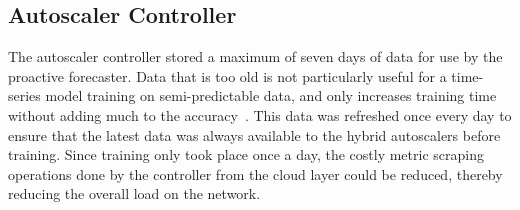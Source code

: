 \begin{center}
\begin{minipage}{\linewidth}
    \label{fig:lstm-final-data}
\end{minipage}
\end{center}

\subsection{Autoscaler Controller}
\label{subsec:ch5-auto-daemon-subsection}

The autoscaler controller stored a maximum of seven days of data for use by the proactive forecaster. Data that is too old is not particularly useful for a time-series model training on semi-predictable data, and only increases training time without adding much to the accuracy~\cite{greff2016lstm}. This data was refreshed once every day to ensure that the latest data was always available to the hybrid autoscalers before training. Since training only took place once a day, the costly metric scraping operations done by the controller from the cloud layer could be reduced, thereby reducing the overall load on the network.\par

